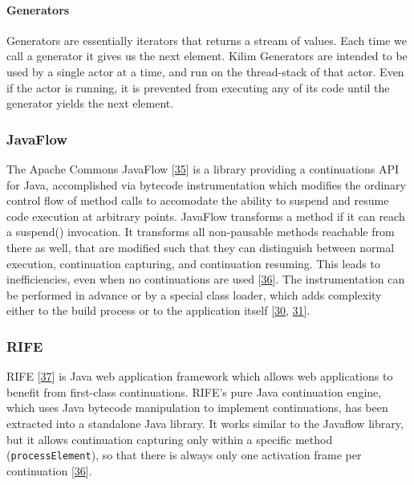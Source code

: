 \documentclass[12pt,a4paper,oneside,openright]{book}
\let\oldparagraph\paragraph
\renewcommand{\paragraph}[1]{\oldparagraph{#1}\mbox{}}
\begin{document}
\paragraph{Generators}\label{generators}

Generators are essentially iterators that returns a stream of values.
Each time we call a generator it gives us the next element. Kilim
Generators are intended to be used by a single actor at a time, and run
on the thread-stack of that actor. Even if the actor is running, it is
prevented from executing any of its code until the generator yields the
next element.

\subsubsection{JavaFlow}\label{javaflow}

The Apache Commons JavaFlow {[}\hyperref[ref-Javaflow2015]{35}{]} is a
library providing a continuations API for Java, accomplished via
bytecode instrumentation which modifies the ordinary control flow of
method calls to accomodate the ability to suspend and resume code
execution at arbitrary points. JavaFlow transforms a method if it can
reach a suspend() invocation. It transforms all non-pausable methods
reachable from there as well, that are modified such that they can
distinguish between normal execution, continuation capturing, and
continuation resuming. This leads to inefficiencies, even when no
continuations are used {[}\hyperref[ref-Stadler2009]{36}{]}. The
instrumentation can be performed in advance or by a special class
loader, which adds complexity either to the build process or to the
application itself {[}\hyperref[ref-Srinivasan2006]{30},
\hyperref[ref-Bolton2000]{31}{]}.

\subsubsection{RIFE}\label{rife}

RIFE {[}\hyperref[ref-RIFE2015]{37}{]} is Java web application framework
which allows web applications to benefit from first-class continuations.
RIFE's pure Java continuation engine, which uses Java bytecode
manipulation to implement continuations, has been extracted into a
standalone Java library. It works similar to the Javaflow library, but
it allows continuation capturing only within a specific method
(\texttt{processElement}), so that there is always only one activation
frame per continuation {[}\hyperref[ref-Stadler2009]{36}{]}.
\end{document}
